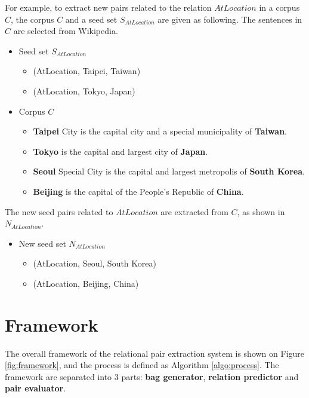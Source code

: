 For example, to extract new pairs related to the relation $AtLocation$ in a corpus $C$, the corpus $C$ and a seed set $S_{AtLocation}$ are given as following. The sentences in $C$ are selected from Wikipedia\cite{Wiki}.

\begin{itemize}
\item Seed set $S_{AtLocation}$
    \begin{itemize}
    \item[] (AtLocation, Taipei, Taiwan)
    \item[] (AtLocation, Tokyo, Japan)
    \end{itemize}
\item Corpus $C$
    \begin{itemize}
    \item[] \textbf{Taipei} City is the capital city and a special municipality of \textbf{Taiwan}.
    \item[] \textbf{Tokyo} is the capital and largest city of \textbf{Japan}.
    \item[] \textbf{Seoul} Special City is the capital and largest metropolis of \textbf{South Korea}.
    \item[] \textbf{Beijing} is the capital of the People's Republic of \textbf{China}.
    \end{itemize}
\end{itemize}

The new seed pairs related to $AtLocation$ are extracted from $C$, as shown in $N_{AtLocation}$.

\begin{itemize}
\item New seed set $N_{AtLocation}$
    \begin{itemize}
    \item[] (AtLocation, Seoul, South Korea)
    \item[] (AtLocation, Beijing, China)
    \end{itemize}
\end{itemize}


\section{Framework}

The overall framework of the relational pair extraction system is shown on Figure \ref{fig:framework}, and the process is defined as Algorithm \ref{algo:process}.
The framework are separated into 3 parts: \textbf{bag generator}, \textbf{relation predictor} and \textbf{pair evaluator}.

